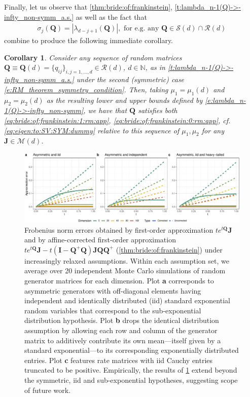 \documentclass[9pt,twocolumn,twoside]{pnas-new}
\newtheorem{Corollary}[Theorem]{Corollary}
\newcommand{\bbN}{{\mathbb N}}
\newcommand{\?}{\textbf{?}}
\newcommand{\QQ}{\mathbf{Q}}
\newcommand{\JJ}{\mathbf{J}}
\newcommand{\II}{\mathbf{I}}
\begin{document}
Finally, let us observe that \cref{thm:bride:of:frankinstein},
\cref{t:lambda_n-1(Q)->-infty_non-symm_a.s.} as well as the fact
that
\begin{align}
  \sigma_j(\QQ) = |\lambda_{d - j +1}(\QQ)|,
  \text{ for e.g. any }
  \QQ \in \mathcal{S}(d) \cap \mathcal{R}(d)
  \label{eq:eigen:to:SV:SYM:dummy}
\end{align}
combine to produce the following immediate corollary.
\begin{Corollary}\label{cor:rig:det:rand:wrapup}
  Consider any sequence of random matrices
  $\QQ \equiv \QQ(d) = \{q_{ij}\}_{i,j=1,\hdots,d} \in
  \mathcal{R}(d)$, $d \in \bbN$, as in
  \cref{t:lambda_n-1(Q)->-infty_non-symm_a.s.} under the second
  (symmetric) case \eqref{e:RM_theorem_symmetry_condition}.  Then,
  taking $\mu_1 = \mu_1(d)$ and $\mu_2= \mu_2(d)$ as the resulting
  lower and upper bounds defined by
  \eqref{e:lambda_n-1(Q)->-infty_non-symm}, we have that $\QQ$
  satisfies both \eqref{eq:bride:of:frankinstein:1:rm:app},
  \eqref{eq:bride:of:frankinstein:0:rm:app}, cf.
  \eqref{eq:eigen:to:SV:SYM:dummy} relative to this sequence of
  $\mu_1, \mu_2$ for any $\JJ \in \mathcal{M}(d)$.
\end{Corollary}


\begin{figure}[!t]
    \centering
    \includegraphics[width=\linewidth]{appendixFig3.pdf}
    \caption{Frobenius norm errors obtained by first-order approximation $te^{t\QQ}\JJ$ and by affine-corrected first-order approximation
      $te^{t\QQ}\JJ - t(\II -\QQ^+ \QQ) \JJ \QQ \QQ^{+}$
      (\cref{thm:bride:of:frankinstein}) under increasingly relaxed
      assumptions.  Within each assumption set, we average over 20
      independent Monte Carlo simulations of random generator matrices
      for each dimension. Plot \textbf{a} corresponds to asymmetric
      generators with off-diagonal elements having independent and
      identically distributed (iid) standard exponential random
      variables that correspond to the sub-exponential distribution
      hypothesis. Plot \textbf{b} drops the identical distribution
      assumption by allowing each row and column of the generator
      matrix to additively contribute its own mean---itself given by a
      standard exponential---to its corresponding exponentially
      distributed entries. Plot \textbf{c} features rate
      matrices with iid Cauchy entries truncated to be
      positive. Empirically, the results of
      \cref{cor:rig:det:rand:wrapup} extend beyond the symmetric,
      iid and sub-exponential hypotheses, suggesting scope of future work.}
    \label{fig:app}
\end{figure}
\end{document}
